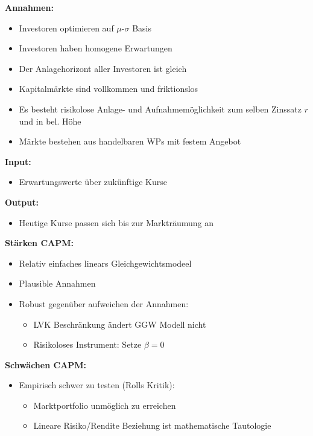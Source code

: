 \documentclass[a4paper]{article}
\theoremstyle{break}
\begin{document}
\textbf{Annahmen:}
\begin{itemize}
    \item Investoren optimieren auf $\mu$-$\sigma$ Basis
    \item Investoren haben homogene Erwartungen
    \item Der Anlagehorizont aller Investoren ist gleich
    \item Kapitalmärkte sind vollkommen und friktionslos
    \item Es besteht risikolose Anlage- und Aufnahmemöglichkeit zum selben Zinssatz $r$ und in bel. Höhe
    \item Märkte bestehen aus handelbaren WPs mit festem Angebot
\end{itemize}

\textbf{Input:}
\begin{itemize}
    \item Erwartungswerte über zukünftige Kurse
\end{itemize}

\textbf{Output:}
\begin{itemize}
    \item Heutige Kurse passen sich bis zur Markträumung an
\end{itemize}

\textbf{Stärken CAPM:}
\begin{itemize}
    \item Relativ einfaches linears Gleichgewichtsmodeel
    \item Plausible Annahmen
    \item Robust gegenüber aufweichen der Annahmen:
    \begin{itemize}
        \item LVK Beschränkung ändert GGW Modell nicht
        \item Risikoloses Instrument: Setze $\beta = 0$        
    \end{itemize}
\end{itemize}

\textbf{Schwächen CAPM:}
\begin{itemize}
    \item Empirisch schwer zu testen (Rolls Kritik):
    \begin{itemize}
        \item Marktportfolio unmöglich zu erreichen
        \item Lineare Risiko/Rendite Beziehung ist mathematische Tautologie
    \end{itemize}
\end{itemize}
\end{document}
